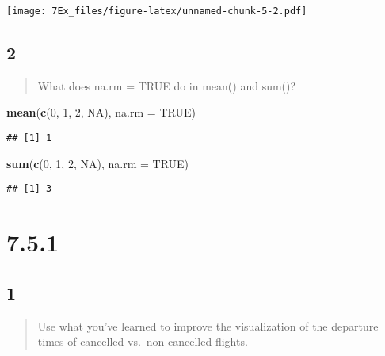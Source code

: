 \documentclass[]{article}
\newenvironment{Shaded}{\begin{snugshade}}{\end{snugshade}}
\newcommand{\DataTypeTok}[1]{\textcolor[rgb]{0.13,0.29,0.53}{#1}}
\newcommand{\DecValTok}[1]{\textcolor[rgb]{0.00,0.00,0.81}{#1}}
\newcommand{\KeywordTok}[1]{\textcolor[rgb]{0.13,0.29,0.53}{\textbf{#1}}}
\newcommand{\NormalTok}[1]{#1}
\newcommand{\OtherTok}[1]{\textcolor[rgb]{0.56,0.35,0.01}{#1}}
\begin{document}
\texttt{[image: 7Ex\_files/figure-latex/unnamed-chunk-5-2.pdf]}

\hypertarget{section-7}{%
\subsection{2}\label{section-7}}

\begin{quote}
What does na.rm = TRUE do in mean() and sum()?
\end{quote}

\begin{Shaded}
\begin{Highlighting}[]
\KeywordTok{mean}\NormalTok{(}\KeywordTok{c}\NormalTok{(}\DecValTok{0}\NormalTok{, }\DecValTok{1}\NormalTok{, }\DecValTok{2}\NormalTok{, }\OtherTok{NA}\NormalTok{), }\DataTypeTok{na.rm =} \OtherTok{TRUE}\NormalTok{)}
\end{Highlighting}
\end{Shaded}

\begin{verbatim}
## [1] 1
\end{verbatim}

\begin{Shaded}
\begin{Highlighting}[]
\KeywordTok{sum}\NormalTok{(}\KeywordTok{c}\NormalTok{(}\DecValTok{0}\NormalTok{, }\DecValTok{1}\NormalTok{, }\DecValTok{2}\NormalTok{, }\OtherTok{NA}\NormalTok{), }\DataTypeTok{na.rm =} \OtherTok{TRUE}\NormalTok{)}
\end{Highlighting}
\end{Shaded}

\begin{verbatim}
## [1] 3
\end{verbatim}

\hypertarget{section-8}{%
\section{7.5.1}\label{section-8}}

\hypertarget{section-9}{%
\subsection{1}\label{section-9}}

\begin{quote}
Use what you've learned to improve the visualization of the departure
times of cancelled vs.~non-cancelled flights.
\end{quote}
\end{document}
